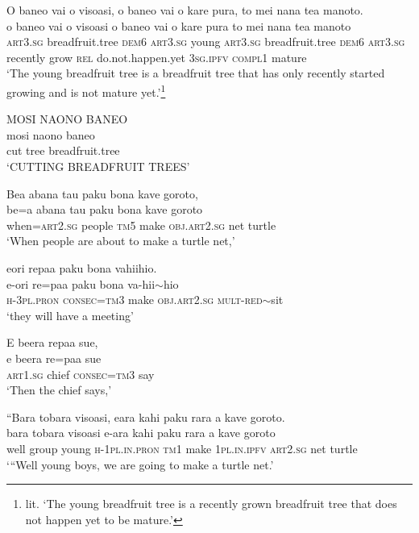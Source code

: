\ea\label{ex:text4-1}
O baneo vai o visoasi, o baneo vai o kare pura, to mei nana tea manoto.\\
\gll o	baneo	vai	o	visoasi	o	baneo	vai	o	kare	pura	to	mei	nana	tea	manoto\\
     \textsc{art}3.\textsc{sg}	breadfruit.tree	\textsc{dem}6	\textsc{art}3.\textsc{sg}	young	\textsc{art}3.\textsc{sg}	breadfruit.tree	\textsc{dem}6	\textsc{art}3.\textsc{sg}	recently	grow	\textsc{rel}	do.not.happen.yet	3\textsc{sg}.\textsc{ipfv}	\textsc{compl}1	mature\\
\glt `The young breadfruit tree is a breadfruit tree that has only recently started growing and is not mature yet.'\footnote{lit. `The young breadfruit tree is a recently grown breadfruit tree that does not happen yet to be mature.'}
\z

\ea\label{ex:text4-2}
MOSI NAONO BANEO\\
\gll mosi	naono	baneo\\
     cut	tree	breadfruit.tree\\
\glt `CUTTING BREADFRUIT TREES'
\z

\ea\label{ex:text4-3}
Bea abana tau paku bona kave goroto,\\
\gll be=a	abana	tau	paku	bona	kave	goroto\\
     when=\textsc{art}2.\textsc{sg}	people	\textsc{tm}5	make	\textsc{obj}.\textsc{art}2.\textsc{sg}	net	turtle\\
\glt `When people are about to make a turtle net,'
\z

\ea\label{ex:text4-4}
eori repaa paku bona vahiihio.\\
\gll e-ori	re=paa	paku	bona	va-hii{$\sim$}hio\\
     \textsc{h}-3\textsc{pl}.\textsc{pron}	\textsc{consec}=\textsc{tm}3	make	\textsc{obj}.\textsc{art}2.\textsc{sg}	\textsc{mult}-\textsc{red}{$\sim$}sit\\
\glt `they will have a meeting'
\z

\ea\label{ex:text4-5}
E beera repaa sue,\\
\gll e	beera	re=paa	sue\\
     \textsc{art}1.\textsc{sg}	chief	\textsc{consec}=\textsc{tm}3	say\\
\glt `Then the chief says,'
\z

\ea\label{ex:text4-6}
``Bara tobara visoasi, eara kahi paku rara a kave goroto.\\
\gll bara	tobara	visoasi	e-ara	kahi	paku	rara	a	kave	goroto\\
     well	group	young	\textsc{h}-1\textsc{pl}.\textsc{in}.\textsc{pron}	\textsc{tm}1	make	1\textsc{pl}.\textsc{in}.\textsc{ipfv}	\textsc{art}2.\textsc{sg}	net	turtle\\
\glt `{``}Well young boys, we are going to make a turtle net.'
\z

